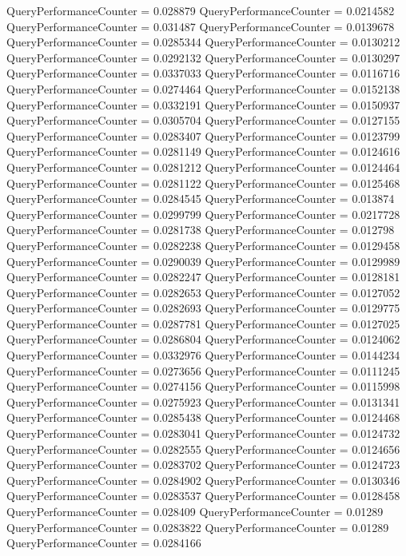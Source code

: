 \documentclass[9pt]{article}
\theoremstyle{plain}
\theoremstyle{definition}
\theoremstyle{remark}
\numberwithin{equation}{section}
\begin{document}
QueryPerformanceCounter  =  0.028879
QueryPerformanceCounter  =  0.0214582
QueryPerformanceCounter  =  0.031487
QueryPerformanceCounter  =  0.0139678
QueryPerformanceCounter  =  0.0285344
QueryPerformanceCounter  =  0.0130212
QueryPerformanceCounter  =  0.0292132
QueryPerformanceCounter  =  0.0130297
QueryPerformanceCounter  =  0.0337033
QueryPerformanceCounter  =  0.0116716
QueryPerformanceCounter  =  0.0274464
QueryPerformanceCounter  =  0.0152138
QueryPerformanceCounter  =  0.0332191
QueryPerformanceCounter  =  0.0150937
QueryPerformanceCounter  =  0.0305704
QueryPerformanceCounter  =  0.0127155
QueryPerformanceCounter  =  0.0283407
QueryPerformanceCounter  =  0.0123799
QueryPerformanceCounter  =  0.0281149
QueryPerformanceCounter  =  0.0124616
QueryPerformanceCounter  =  0.0281212
QueryPerformanceCounter  =  0.0124464
QueryPerformanceCounter  =  0.0281122
QueryPerformanceCounter  =  0.0125468
QueryPerformanceCounter  =  0.0284545
QueryPerformanceCounter  =  0.013874
QueryPerformanceCounter  =  0.0299799
QueryPerformanceCounter  =  0.0217728
QueryPerformanceCounter  =  0.0281738
QueryPerformanceCounter  =  0.012798
QueryPerformanceCounter  =  0.0282238
QueryPerformanceCounter  =  0.0129458
QueryPerformanceCounter  =  0.0290039
QueryPerformanceCounter  =  0.0129989
QueryPerformanceCounter  =  0.0282247
QueryPerformanceCounter  =  0.0128181
QueryPerformanceCounter  =  0.0282653
QueryPerformanceCounter  =  0.0127052
QueryPerformanceCounter  =  0.0282693
QueryPerformanceCounter  =  0.0129775
QueryPerformanceCounter  =  0.0287781
QueryPerformanceCounter  =  0.0127025
QueryPerformanceCounter  =  0.0286804
QueryPerformanceCounter  =  0.0124062
QueryPerformanceCounter  =  0.0332976
QueryPerformanceCounter  =  0.0144234
QueryPerformanceCounter  =  0.0273656
QueryPerformanceCounter  =  0.0111245
QueryPerformanceCounter  =  0.0274156
QueryPerformanceCounter  =  0.0115998
QueryPerformanceCounter  =  0.0275923
QueryPerformanceCounter  =  0.0131341
QueryPerformanceCounter  =  0.0285438
QueryPerformanceCounter  =  0.0124468
QueryPerformanceCounter  =  0.0283041
QueryPerformanceCounter  =  0.0124732
QueryPerformanceCounter  =  0.0282555
QueryPerformanceCounter  =  0.0124656
QueryPerformanceCounter  =  0.0283702
QueryPerformanceCounter  =  0.0124723
QueryPerformanceCounter  =  0.0284902
QueryPerformanceCounter  =  0.0130346
QueryPerformanceCounter  =  0.0283537
QueryPerformanceCounter  =  0.0128458
QueryPerformanceCounter  =  0.028409
QueryPerformanceCounter  =  0.01289
QueryPerformanceCounter  =  0.0283822
QueryPerformanceCounter  =  0.01289
QueryPerformanceCounter  =  0.0284166
\end{document}
